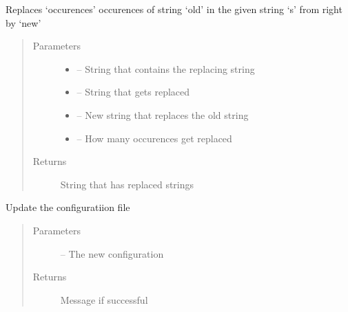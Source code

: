 \documentclass[letterpaper,10pt,english]{sphinxmanual}
\begin{document}

\begin{fulllineitems}
\label{_source/son_editor.util:son_editor.util.requestutil.rreplace}
Replaces `occurences' occurences of string `old' in the given string `s' from right by `new'
\begin{quote}\begin{description}
\item[{Parameters}] \leavevmode\begin{itemize}
\item {} 
 -- String that contains the replacing string

\item {} 
 -- String that gets replaced

\item {} 
 -- New string that replaces the old string

\item {} 
 -- How many occurences get replaced

\end{itemize}

\item[{Returns}] \leavevmode
String that has replaced strings

\end{description}\end{quote}

\end{fulllineitems}


\begin{fulllineitems}
\label{_source/son_editor.util:son_editor.util.requestutil.update_config}
Update the configuratiion file
\begin{quote}\begin{description}
\item[{Parameters}] \leavevmode
{} -- The new configuration

\item[{Returns}] \leavevmode
Message if successful

\end{description}\end{quote}

\end{fulllineitems}
\end{document}
